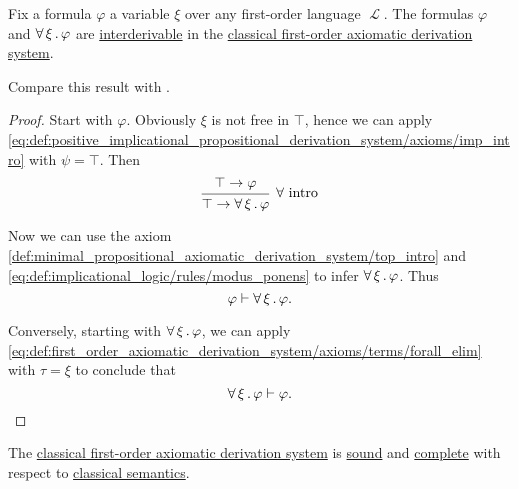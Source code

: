 \begin{proposition}\label{thm:syntactic_implicit_universal_quantification}
  Fix a formula \( \varphi \) a variable \( \xi \) over any first-order language \( \mscrL \). The formulas \( \varphi \) and \( \forall \thinspace \xi \thinspace . \thinspace \varphi \) are \hyperref[def:first_order_semantics/interderivable]{interderivable} in the \hyperref[def:first_order_axiomatic_derivation_system]{classical first-order axiomatic derivation system}.

  Compare this result with .
\end{proposition}
\begin{proof}
  Start with \( \varphi \). Obviously \( \xi \) is not free in \( \top \), hence we can apply \eqref{eq:def:positive_implicational_propositional_derivation_system/axioms/imp_intro} with \( \psi = \top \). Then
  \begin{equation*}
    \begin{prooftree}
      \hypo{\top \rightarrow \varphi}
      \infer1[\( \forall \) intro]{\top \rightarrow \qforall \xi \varphi}
    \end{prooftree}
  \end{equation*}

  Now we can use the axiom \eqref{def:minimal_propositional_axiomatic_derivation_system/top_intro} and \eqref{eq:def:implicational_logic/rules/modus_ponens} to infer \( \forall \thinspace \xi \thinspace . \thinspace \varphi \). Thus
  \begin{equation*}
    \varphi \vdash \forall \thinspace \xi \thinspace . \thinspace \varphi.
  \end{equation*}

  Conversely, starting with \( \forall \thinspace \xi \thinspace . \thinspace \varphi \), we can apply \eqref{eq:def:first_order_axiomatic_derivation_system/axioms/terms/forall_elim} with \( \tau = \xi \) to conclude that
  \begin{equation*}
    \forall \thinspace \xi \thinspace . \thinspace \varphi \vdash \varphi.
  \end{equation*}
\end{proof}

\begin{theorem}\label{thm:classical_first_order_logic_is_sound_and_complete}
  The \hyperref[def:first_order_axiomatic_derivation_system]{classical first-order axiomatic derivation system} is \hyperref[def:derivability_and_satisfiability/soundness]{sound} and \hyperref[def:derivability_and_satisfiability/completeness]{complete} with respect to \hyperref[def:first_order_semantics]{classical semantics}.
\end{theorem}

